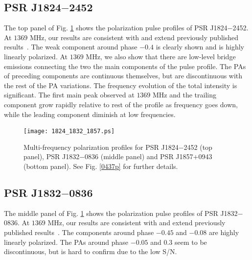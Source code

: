 \documentclass[useAMS,usenatbib]{mn2e}
\begin{document}
\subsection{PSR J1824$-$2452}

The top panel of Fig. \ref{1824p} shows the polarization pulse profiles of 
PSR J1824$-$2452.
%
At $1369$ MHz, our results are consistent with and extend previously published 
results~\citep{Yan11}.
%
The weak component around phase $-0.4$ is clearly shown and is highly 
linearly polarized. 
%
At $1369$ MHz, we also show that there are low-level bridge emissions 
connecting the two the main components of the pulse profile.
%
The PAs of preceding components are continuous themselves, but are 
discontinuous with the rest of the PA variations.
%
The frequency evolution of the total intensity is significant. The first 
main peak observed at $1369$ MHz and the trailing component grow rapidly 
relative to rest of the profile as frequency goes down, while the leading 
component diminish at low frequencies.


\begin{figure}
\begin{center}
\texttt{[image: 1824\_1832\_1857.ps]}
\caption{Multi-frequency polarization profiles for PSR J1824$-$2452 (top 
panel), PSR J1832$-$0836 (middle panel) and PSR J1857$+$0943 (bottom panel). 
See Fig. \ref{0437p} for further details.}
\label{1824p}
\end{center}
\end{figure}

\subsection{PSR J1832$-$0836}

The middle panel of Fig. \ref{1824p} shows the polarization pulse profiles of 
PSR J1832$-$0836.
%
At $1369$ MHz, our results are consistent with and extend previously published 
results~\citep{Burgay13}.
%
The components around phase $-0.45$ and $-0.08$ are highly linearly polarized. 
%
The PAs around phase $-0.05$ and $0.3$ seem to be discontinuous, but is hard 
to confirm due to the low S/N.
\end{document}
